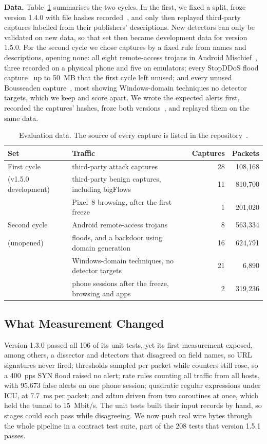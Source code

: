 \documentclass[runningheads]{llncs}
\begin{document}
\textbf{Data.} Table~\ref{tab:data} summarises the two cycles. In the first, we fixed a split, froze version 1.4.0 with file hashes recorded~\cite{repo}, and only then replayed third-party captures labelled from their publishers' descriptions. New detectors can only be validated on new data, so that set then became development data for version 1.5.0. For the second cycle we chose captures by a fixed rule from names and descriptions, opening none: all eight remote-access trojans in Android Mischief~\cite{mischief}, three recorded on a physical phone and five on emulators; every StopDDoS flood capture~\cite{stopddos} up to 50~MB that the first cycle left unused; and every unused Bousseaden capture~\cite{bousseaden}, most showing Windows-domain techniques no detector targets, which we keep and score apart. We wrote the expected alerts first, recorded the captures' hashes, froze both versions~\cite{repo}, and replayed them on the same data.

\begin{table}[t]
\centering
\caption{Evaluation data. The source of every capture is listed in the repository~\cite{repo}.}\label{tab:data}
\begin{tabular}{@{}llrr@{}}
\toprule
Set & Traffic & Captures & Packets \\
\midrule
First cycle & third-party attack captures & 28 & 108{,}168 \\
(v1.5.0 development) & third-party benign captures, including bigFlows~\cite{tcpreplay} & 11 & 810{,}700 \\
 & Pixel~8 browsing, after the first freeze & 1 & 201{,}020 \\
Second cycle & Android remote-access trojans & 8 & 563{,}334 \\
(unopened) & floods, and a backdoor using domain generation & 16 & 624{,}791 \\
 & Windows-domain techniques, no detector targets & 21 & 6{,}890 \\
 & phone sessions after the freeze, browsing and apps & 2 & 319{,}236 \\
\bottomrule
\end{tabular}
\end{table}

\subsection{What Measurement Changed}\label{sec:defects}

Version 1.3.0 passed all 106 of its unit tests, yet its first measurement exposed, among others, a dissector and detectors that disagreed on field names, so URL signatures never fired; thresholds sampled per packet while counters still rose, so a 400~pps SYN flood raised no alert; rate rules counting all traffic from all hosts, with 95{,}673 false alerts on one phone session; quadratic regular expressions under ICU, at 7.7~ms per packet; and zdtun driven from two coroutines at once, which held the tunnel to 15~Mbit/s. The unit tests built their input records by hand, so stages could each pass while disagreeing. We now push real wire bytes through the whole pipeline in a contract test suite, part of the 208 tests that version 1.5.1 passes.
\end{document}
